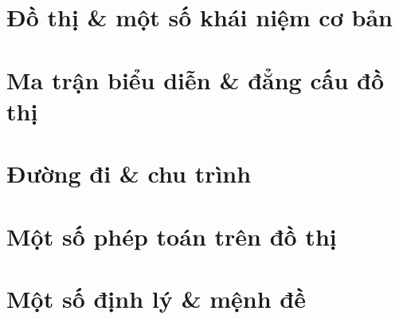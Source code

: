 \documentclass[14pt]{extarticle}
\begin{document}
\tableofcontents\pagebreak


\section{Đồ thị \& một số khái niệm cơ bản}


\section{Ma trận biểu diễn \& đẳng cấu đồ thị}


\section{Đường đi \& chu trình}


\section{Một số phép toán trên đồ thị}
\label{sec:mot_so_phep_toan_tren_do_thi}


\section{Một số định lý \& mệnh đề}
\label{sec:mot_so_dinh_ly_menh_de}

\end{document}
